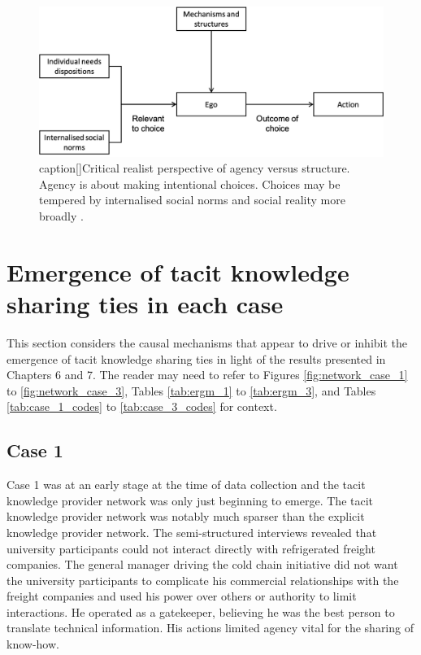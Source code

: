 \begin{figure}[hbt!]
    \centering
    \includegraphics[width = \textwidth]{Images/agency_structure_loyal.png}
    caption[]{Critical realist perspective of agency versus structure. Agency is about making intentional choices. Choices may be tempered by internalised social norms and social reality more broadly \citep{loyal2001agency}.}
    \label{fig:agency_structure4}
\end{figure}

\section{Emergence of tacit knowledge sharing ties in each case}

This section considers the causal mechanisms that appear to drive or inhibit the emergence of tacit knowledge sharing ties in light of the results presented in Chapters 6 and 7. The reader may need to refer to Figures \ref{fig:network_case_1} to \ref{fig:network_case_3}, Tables \ref{tab:ergm_1} to \ref{tab:ergm_3}, and Tables \ref{tab:case_1_codes} to \ref{tab:case_3_codes} for context.

\subsection{Case 1}

Case 1 was at an early stage at the time of data collection and the tacit knowledge provider network was only just beginning to emerge. The tacit knowledge provider network was notably much sparser than the explicit knowledge provider network. The semi-structured interviews revealed that university participants could not interact directly with refrigerated freight companies. The general manager driving the cold chain initiative did not want the university participants to complicate his commercial relationships with the freight companies and used his power over others or authority to limit interactions. He operated as a gatekeeper, believing he was the best person to translate technical information. His actions limited agency vital for the sharing of know-how. \medskip

